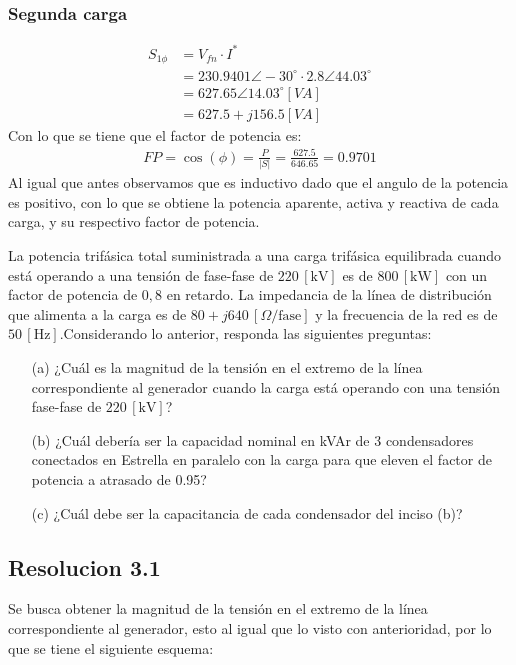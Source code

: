 \documentclass[
  11pt,
  letterpaper,
   addpoints,
   answers
  ]{exam}
\begin{document}
\begin{questions}
\begin{solution}
\subsubsection*{Segunda carga}
\begin{align}
    S_{1\phi} &= V_{fn} \cdot I^{*}\\
    &= 230.9401 \angle -30^{\circ} \cdot 2.8 \angle 44.03^{\circ}\\
    &= 627.65 \angle 14.03^{\circ} [VA]\\
    &= 627.5 + j 156.5 [VA]
\end{align}
Con lo que se tiene que el factor de potencia es:
\begin{align}
    FP = \cos(\phi) = \frac{P}{|S|} = \frac{627.5}{646.65} = 0.9701
\end{align}
Al igual que antes observamos que es inductivo dado que el angulo de la potencia es positivo, con lo que se obtiene la potencia aparente, activa y reactiva de cada carga, y su respectivo factor de potencia.
\end{solution}
\question La potencia trifásica total suministrada a una carga trifásica equilibrada cuando está operando a una tensión de fase-fase de \(220 \, [\text{kV}]\) es de \(800 \, [\text{kW}]\) con un factor de potencia de \(0,8\) en retardo. La impedancia de la línea de distribución que alimenta a la carga es de \(80 + j640 \, [\Omega/\text{fase}]\) y la frecuencia de la red es de \(50 \, [\text{Hz}]\).Considerando lo anterior, responda las siguientes preguntas:
\begin{enumerate}
    \item[(a)] ¿Cuál es la magnitud de la tensión en el extremo de la línea correspondiente al generador cuando la carga está operando con una tensión fase-fase de \(220 \, [\text{kV}]\)?
    \item[(b)] ¿Cuál debería ser la capacidad nominal en kVAr de 3 condensadores conectados en Estrella en paralelo con la carga para que eleven el factor de potencia a atrasado de 0.95?
    \item[(c)] ¿Cuál debe ser la capacitancia de cada condensador del inciso (b)?
\end{enumerate}
\begin{solution}
    \subsection*{Resolucion 3.1}
    Se busca obtener la magnitud de la tensión en el extremo de la línea correspondiente al generador, esto al igual que lo visto con anterioridad, por lo que se tiene el siguiente esquema:
    \begin{center}
        \begin{circuitikz}


\end{circuitikz}
\end{center}
\end{solution}
\end{questions}
\end{document}
